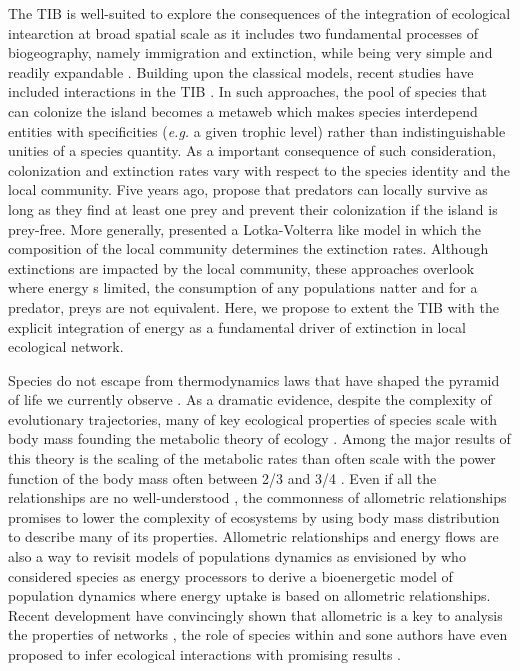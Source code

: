 The TIB is well-suited to explore the consequences of the integration of
ecological intearction at broad spatial scale as it includes two
fundamental processes of biogeography, namely immigration and
extinction, while being very simple and readily expandable
\citep{Losos2010, Warren2015}. Building upon the classical models,
recent studies have included interactions in the TIB
\citep{Gravel2011, Cazelles2015a}. In such approaches, the pool of
species that can colonize the island becomes a metaweb which makes
species interdepend entities with specificities (\emph{e.g.} a given
trophic level) rather than indistinguishable unities of a species
quantity. As a important consequence of such consideration, colonization
and extinction rates vary with respect to the species identity and the
local community. Five years ago, \citet{Gravel2011} propose that
predators can locally survive as long as they find at least one prey and
prevent their colonization if the island is prey-free. More generally,
\citet{Cazelles2015b} presented a Lotka-Volterra like model in which the
composition of the local community determines the extinction rates.
Although extinctions are impacted by the local community, these
approaches overlook where energy s limited, the consumption of any
populations natter and for a predator, preys are not equivalent. Here,
we propose to extent the TIB with the explicit integration of energy as
a fundamental driver of extinction in local ecological network.

Species do not escape from thermodynamics laws that have shaped the
pyramid of life we currently observe \citep{Trebilco2013}. As a dramatic
evidence, despite the complexity of evolutionary trajectories, many of
key ecological properties of species scale with body mass
\citep{Woodward2005a} founding the metabolic theory of ecology
\citep{Brown2004}. Among the major results of this theory is the scaling
of the metabolic rates \citep{Gillooly2001} than often scale with the
power function of the body mass often between 2/3 and 3/4
\citep{White2013}. Even if all the relationships are no well-understood
\citep[see the case of abundances reviewed in][ and the recent
relationship between prey and predator biomasses
\citet{Hatton2015}]{White2007}, the commonness of allometric
relationships promises to lower the complexity of ecosystems by using
body mass distribution to describe many of its properties. Allometric
relationships and energy flows are also a way to revisit models of
populations dynamics as envisioned by \citet{Yodzis1992} who considered
species as energy processors to derive a bioenergetic model of
population dynamics where energy uptake is based on allometric
relationships. Recent development have convincingly shown that
allometric is a key to analysis the properties of networks \citep[such
as stability][]{Brose2006}, the role of species within
\citep{Schneider2012} and sone authors have even proposed to infer
ecological interactions with promising results
\citep{Gravel2013, Petchey2008}.

